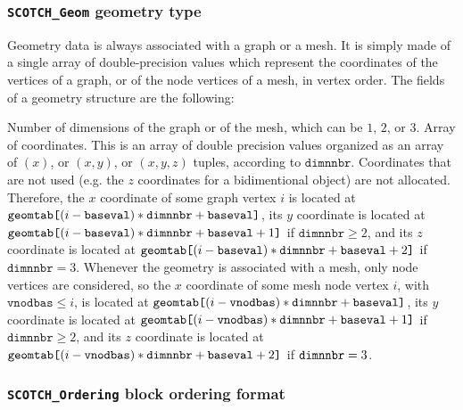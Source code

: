 \subsubsection{\texttt{SCOTCH\_\lbt Geom} geometry type}
\label{sec-lib-type-geom}

Geometry data is always associated with a graph or a mesh. It is
simply made of a single array of double-precision values which
represent the coordinates of the vertices of a graph, or of
the node vertices of a mesh, in vertex order. The fields of
a geometry structure are the following:
\begin{itemize}
\iteme[{\tt dimnnbr}]
Number of dimensions of the graph or of the mesh, which can be $1$,
$2$, or $3$.
\iteme[{\tt geomtab}]
Array of coordinates. This is an array of double precision values
organized as an array of $(x)$, or $(x,y)$, or $(x,y,z)$ tuples,
according to $\mathtt{dimnnbr}$. Coordinates that are not used
(e.g. the $z$ coordinates for a bidimentional object) are not
allocated. Therefore, the $x$ coordinate of some graph vertex $i$ is
located at $\mathtt{geomtab}\mbox{\tt [}(i - \mathtt{baseval}) *
\mathtt{dimnnbr}  + \mathtt{baseval}\mbox{\tt ]}$, its $y$ coordinate
is located at $\mathtt{geomtab}\mbox{\tt [}(i - \mathtt{baseval}) *
  \mathtt{dimnnbr} + \mathtt{baseval} + 1\mbox{\tt ]}$ if
$\mathtt{dimnnbr} \geq 2$, and its $z$ coordinate is located at
$\mathtt{geomtab}\mbox{\tt [}(i - \mathtt{baseval}) * \mathtt{dimnnbr}
+ \mathtt{baseval} + 2\mbox{\tt ]}$ if $\mathtt{dimnnbr} =
3$. Whenever the geometry is associated with a mesh,
only node vertices are considered, so the $x$ coordinate of some mesh
node vertex $i$, with $\mathtt{vnodbas} \leq i$, is located
at $\mathtt{geomtab}\mbox{\tt [}(i - \mathtt{vnodbas}) *
\mathtt{dimnnbr} + \mathtt{baseval}\mbox{\tt ]}$, its $y$ coordinate
is located at $\mathtt{geomtab}\mbox{\tt [}(i - \mathtt{vnodbas}) *
\mathtt{dimnnbr} + \mathtt{baseval} + 1\mbox{\tt ]}$ if
$\mathtt{dimnnbr} \geq 2$, and its $z$ coordinate is located at
$\mathtt{geomtab}\mbox{\tt [}(i - \mathtt{vnodbas}) * \mathtt{dimnnbr}
+ \mathtt{baseval} + 2\mbox{\tt ]}$ if $\mbox{\tt dimnnbr} = 3$.
\end{itemize}

\subsubsection{\texttt{SCOTCH\_\lbt Ordering} block ordering format}
\label{sec-lib-type-ordering}


